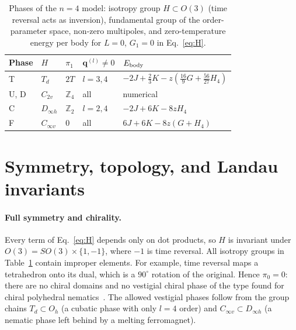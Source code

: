 \documentclass[pre,twocolumn,superscriptaddress,amsmath,amssymb,floatfix]{revtex4-2}
\newcommand{\qv}{\mathbf{q}}
\begin{document}
\begin{table}[t]
\caption{Phases of the $n=4$ model: isotropy group $H\subset O(3)$ (time reversal acts as inversion), fundamental group of the order-parameter space, non-zero multipoles, and zero-temperature energy per body for $L=0$, $G_1=0$ in Eq.~\eqref{eq:H}.}
\label{tab:phases}
\begin{ruledtabular}
\begin{tabular}{lllll}
Phase & $H$ & $\pi_1$ & $\qv^{(l)}\neq0$ & $E_{\rm body}$\\
\hline
T & $T_d$ & $2T$ & $l=3,4$ & $-2J+\tfrac23K-z(\tfrac{16}{9}G+\tfrac{56}{27}H_4)$\\
U, D & $C_{2v}$ & $\mathbb{Z}_4$ & all & numerical\\
C & $D_{\infty h}$ & $\mathbb{Z}_2$ & $l=2,4$ & $-2J+6K-8zH_4$\\
F & $C_{\infty v}$ & $0$ & all & $6J+6K-8z(G+H_4)$\\
\end{tabular}
\end{ruledtabular}
\end{table}

\section{Symmetry, topology, and Landau invariants}\label{sec:sym}

\paragraph*{Full symmetry and chirality.} Every term of Eq.~\eqref{eq:H} depends only on dot products, so $H$ is invariant under $O(3)=SO(3)\times\{1,-1\}$, where $-1$ is time reversal. All isotropy groups in Table~\ref{tab:phases} contain improper elements. For example, time reversal maps a tetrahedron onto its dual, which is a $90^\circ$ rotation of the original. Hence $\pi_0=0$: there are no chiral domains and no vestigial chiral phase of the type found for chiral polyhedral nematics~\cite{Liu2016}. The allowed vestigial phases follow from the group chains $T_d\subset O_h$ (a cubatic phase with only $l=4$ order) and $C_{\infty v}\subset D_{\infty h}$ (a nematic phase left behind by a melting ferromagnet).
\end{document}
